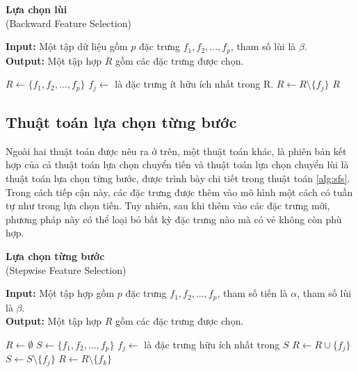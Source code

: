 \begin{breakablealgorithm}
	\caption{\textbf{Lựa chọn lùi}\\
		(Backward Feature Selection)}\label{alg:bfs}
	\noindent\textbf{Input:} Một tập dữ liệu gồm $p$ đặc trưng $f_1,f_2,...,f_p$, tham số lùi là $\beta$.\\
	\textbf{Output:} Một tập hợp $R$ gồm các đặc trưng được chọn.
	\begin{algorithmic}[1]
		\State $R \gets \{f_1, f_2,\ldots, f_p\}$
		\State $f_j \gets$ là đặc trưng ít hữu ích nhất trong R.
		\State $R \gets R\setminus \{f_j\}$
		\Else 
		\State \Return $R$
		\EndIf
		\EndWhile
	\end{algorithmic}
\end{breakablealgorithm} 

\subsection{Thuật toán lựa chọn từng bước}
Ngoài hai thuật toán được nêu ra ở trên, một thuật toán khác, là phiên bản kết hợp của cả thuật toán lựa chọn chuyển tiến và thuật toán lựa chọn chuyển lùi là thuật toán lựa chọn từng bước, được trình bày chi tiết trong thuật toán \ref{alg:sfs}. Trong cách tiếp cận này, các đặc trưng được thêm vào mô hình một cách có tuần tự như trong lựa chọn tiến. Tuy nhiên, sau khi thêm vào các đặc trưng mới, phương pháp này có thể loại bỏ bất kỳ đặc trưng nào mà có vẻ không còn phù hợp.

\begin{breakablealgorithm}
	\caption{\textbf{Lựa chọn từng bước}\\
		(Stepwise Feature Selection)}\label{alg:sfs}
	\noindent\textbf{Input:} Một tập hợp gồm $p$ đặc trưng $f_1,f_2,...,f_p$, tham số tiến là $\alpha$, tham số lùi là $\beta$.\\
	\textbf{Output:} Một tập hợp $R$ gồm các đặc trưng được chọn.
	\begin{algorithmic}[1]
		\State $R \gets \emptyset$
		\State $S \gets \{f_1, f_2,\ldots, f_p\}$
		\State $f_j \gets$ là đặc trưng hữu ích nhất trong $S$
		\State $R \gets R \cup \{f_j\}$
		\State $S \gets S\setminus \{f_j\}$
		\State $R \gets R\setminus \{f_k\}$
		\EndIf
		\EndWhile\;
		\Else 
		\EndIf
		\EndWhile
	\end{algorithmic}
\end{breakablealgorithm}

